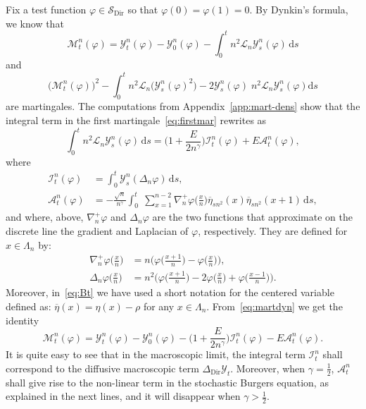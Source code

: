 \documentclass[10pt]{amsart}
\theoremstyle{definition}\newtheorem{defi}[theo]{Definition}\newtheorem{rema}[theo]{Remark}\newtheorem{exam}[theo]{Example}\newtheorem{exem}[theo]{Example}\newtheorem{nota}[theo]{Notation}
\DeclareMathOperator{\Dir}{Dir}
\newcommand{\mc}[1]{{\mathcal #1}}
\renewcommand{\mc}[1]{{\mathcal #1}}
\renewcommand{\bar}{\overline}
\newcommand*{\dd}{\mathrm{d}}
\newcommand*{\ds}{\dd s}
\begin{document}
Fix a test function $\varphi\in\mc S_{\Dir}$ so that $\varphi(0)=\varphi(1)=0$. By Dynkin's formula, we know that
\begin{equation}\label{eq:firstmar}
\mathcal{M}_t^n(\varphi)=\mathcal{Y}_t^n(\varphi)-\mathcal{Y}_0^n(\varphi)-\int_0^t n^2\mathcal{L}_n \mathcal{Y}_s^n(\varphi)\, \ds
\end{equation}
and
\begin{equation}
\big(\mc M_t^n(\varphi)\big)^2 - \int_0^t n^2\mc L_n \big(\mc Y^n_s(\varphi)^2\big)-2\mc Y^n_s(\varphi)\; n^2\mc L_n \mc Y^n_s(\varphi) \ds \label{eq:secondmar}
\end{equation}
are martingales. The computations from Appendix~\ref{app:mart-dens} show that the integral term in the first martingale~\eqref{eq:firstmar} rewrites as
\begin{equation}\label{eq:martdyn}
\int_0^t n^2 \mc L_n\mc Y_s^n(\varphi)\,\ds = \Big(1+\frac{E}{2n^\gamma}\Big)\mc I_t^n(\varphi) + E\mc A_t^n(\varphi),
\end{equation}
where
\begin{align}
\mc I_t^n(\varphi)&= \int_0^t \mc Y_s^n(\Delta_n \varphi) \,\ds, \label{eq:I}
\\
\mc A_t^n(\varphi)&= - \frac{\sqrt n}{n^\gamma}\int_0^t\; \sum_{x=1}^{n-2} \nabla_n^+\varphi\Big(\frac{x}{n}\Big) \bar\eta_{sn^2}(x)\bar\eta_{sn^2}(x+1) \,\ds, \label{eq:Bt}
\end{align}
and where, above, $\nabla_n^+ \varphi$ and $\Delta_n \varphi$ are the two functions that approximate on the discrete line the gradient and Laplacian of $\varphi$, respectively. They are defined for $x \in \Lambda_n$ by:
\begin{align*}
\nabla_n^+ \varphi\Big(\frac{x}{n}\Big) & = n\Big(\varphi\Big(\frac{x+1}{n}\Big)-\varphi\Big(\frac{x}{n}\Big)\Big), \\
\Delta_n\varphi\Big(\frac{x}{n}\Big) & =n^2\Big(\varphi\Big(\frac{x+1}{n}\Big)-2\varphi\Big(\frac{x}{n}\Big) + \varphi\Big(\frac{x-1}{n}\Big)\Big).
\end{align*}
Moreover, in~\eqref{eq:Bt} we have used a short notation for the centered variable defined as: $\bar \eta(x)=\eta(x)-\rho$ for any $x\in\Lambda_n$. From~\eqref{eq:martdyn} we get the identity
\begin{equation}\label{mart_decomp}
\mathcal{M}_t^n(\varphi)=\mathcal{Y}_t^n(\varphi)-\mathcal{Y}_0^n(\varphi)-\Big(1+\frac{E}{2n^\gamma}\Big)\mc I_t^n(\varphi) - E\mc A_t^n(\varphi).
\end{equation}
It is quite easy to see that in the macroscopic limit, the integral term $\mc I_t^n$ shall correspond to the diffusive macroscopic term $\Delta_{\Dir} \mc Y_t$. Moreover, when $\gamma=\frac12$, $\mc A_t^n$ shall give rise to the non-linear term in the stochastic Burgers equation, as explained in the next lines, and it will disappear when $\gamma > \frac12$.
\end{document}
